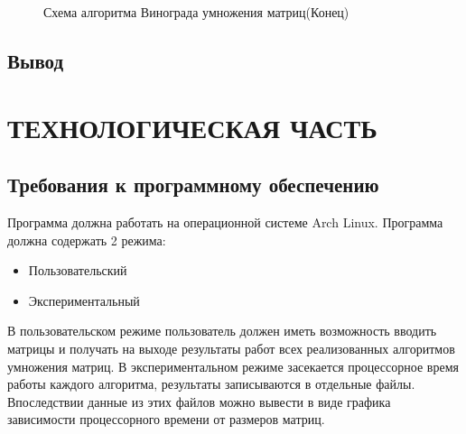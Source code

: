 \documentclass[a4paper,12pt]{article}
\begin{document}
\begin{figure}[p]
\caption{Схема алгоритма Винограда умножения матриц(Конец)}
\label{images:multiply_vinograd2}
\end{figure}

\newpage
\subsection{Вывод}

\newpage
\section{ТЕХНОЛОГИЧЕСКАЯ ЧАСТЬ}
\subsection{Требования к программному обеспечению}

\begin{flushleft}
Программа должна работать на операционной системе Arch Linux. Программа должна
содержать 2 режима:
\begin{itemize}
\item Пользовательский
\item Экспериментальный
\end{itemize}
В пользовательском режиме пользователь должен иметь возможность вводить матрицы и получать на выходе результаты работ всех реализованных алгоритмов умножения матриц. В экспериментальном режиме засекается процессорное время работы каждого алгоритма, результаты записываются в отдельные файлы. Впоследствии данные из этих файлов можно вывести в виде графика зависимости процессорного времени от размеров матриц.
\end{flushleft}
\end{document}
